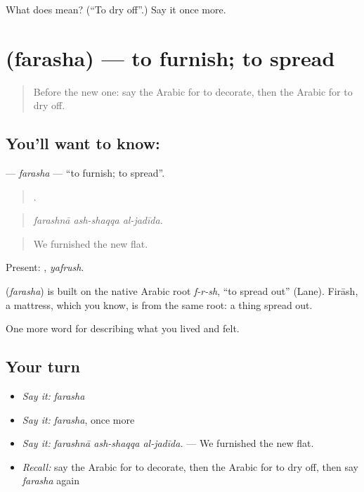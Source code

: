 \begin{tcolorbox}[breakable,colback=teal!4,colframe=teal!35!black,title={Before you move on}]
What does  mean? (\textquotedblleft{}To dry off\textquotedblright{}.) Say it once more.
\end{tcolorbox}
\section[\texorpdfstring{\ar{فرش} (farasha)}{فرش (farasha)}]{ (farasha) — to furnish; to spread}

\label{lesson:AR-C552-farasha}



\begin{quote}
Before the new one: say the Arabic for to decorate, then the Arabic for to dry off.
\end{quote}

\subsection*{You'll want to know: }
\textbf{} — \emph{farasha} — \textquotedblleft{}to furnish; to spread\textquotedblright{}.

\begin{quote}
  .
\end{quote}

\begin{quote}
\emph{farashnā ash-shaqqa al-jadīda.}
\end{quote}

\begin{quote}
We furnished the new flat.
\end{quote}

Present: , \emph{yafrush}.

\begin{cousinweb}
\textbf{} (\emph{farasha}) is built on the native Arabic root \emph{f-r-sh}, \textquotedblleft{}to spread out\textquotedblright{} (Lane). Firāsh, a mattress, which you know, is from the same root: a thing spread out.
\end{cousinweb}

\begin{grammarlens}[title={What you've built}]
One more word for describing what you lived and felt.
\end{grammarlens}

\subsection*{Your turn}
\begin{itemize}
\raggedright
  \item \emph{Say it:} \emph{farasha}
  \item \emph{Say it:} \emph{farasha}, once more
  \item \emph{Say it:} \emph{farashnā ash-shaqqa al-jadīda.} — We furnished the new flat.
  \item \emph{Recall:} say the Arabic for to decorate, then the Arabic for to dry off, then say \emph{farasha} again
\end{itemize}

